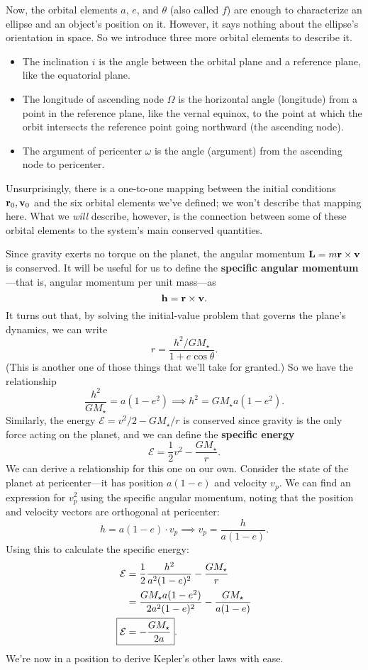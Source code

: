 \documentclass[../a062main.tex]{subfiles}
\begin{document}
Now, the orbital elements $a$, $e$, and $\theta$ (also called $f$) are enough to characterize an ellipse and an object's position on it.
However, it says nothing about the ellipse's orientation in space.
So we introduce three more orbital elements to describe it.
\begin{itemize}
    \item The inclination $i$ is the angle between the orbital plane and a reference plane, like the equatorial plane.
    \item The longitude of ascending node $\Omega$ is the horizontal angle (longitude) from a point in the reference plane, like the vernal equinox, to the point at which the orbit intersects the reference point going northward (the ascending node).
    \item The argument of pericenter $\omega$ is the angle (argument) from the ascending node to pericenter.
\end{itemize}
Unsurprisingly, there is a one-to-one mapping between the initial conditions $\mathbf{r}_0, \mathbf{v}_0$ and the six orbital elements we've defined; we won't describe that mapping here.
What we \textit{will} describe, however, is the connection between some of these orbital elements to the system's main conserved quantities.

Since gravity exerts no torque on the planet, the angular momentum $\mathbf{L} = m \mathbf{r} \times \mathbf{v}$ is conserved.
It will be useful for us to define the \textbf{specific angular momentum}---that is, angular momentum per unit mass---as
\[ \mathbf{h} = \mathbf{r} \times \mathbf{v}. \]
It turns out that, by solving the initial-value problem that governs the plane's dynamics, we can write
\[ r = \frac{h^2/GM_\star}{1 + e \cos \theta}. \]
(This is another one of those things that we'll take for granted.)
So we have the relationship
\[ \frac{h^2}{GM_\star} = a (1 - e^2) \implies \boxed{h^2 = GM_\star a (1 - e^2)}. \]
Similarly, the energy $\mathcal{E} = v^2 / 2 - GM_\star / r$ is conserved since gravity is the only force acting on the planet, and we can define the \textbf{specific energy}
\[ \mathcal{E} = \frac{1}{2}v^2 - \frac{GM_\star}{r}. \]
We can derive a relationship for this one on our own.
Consider the state of the planet at pericenter---it has position $a(1 - e)$ and velocity $v_p$.
We can find an expression for $v_p^2$ using the specific angular momentum, noting that the position and velocity vectors are orthogonal at pericenter:
\[ h = a (1 - e) \cdot v_p \implies v_p = \frac{h}{a (1 - e)}. \]
Using this to calculate the specific energy:
\begin{align*}
    \mathcal{E} &= \frac{1}{2} \frac{h^2}{a^2 (1-e)^2} - \frac{GM_\star}{r} \\
    &= \frac{GM_\star a (1 - e^2)}{2a^2 (1-e)^2} - \frac{GM_\star}{a (1-e)} \\
    \Aboxed{\mathcal{E} &= -\frac{GM_\star}{2a}}.
\end{align*}
We're now in a position to derive Kepler's other laws with ease.
\end{document}
